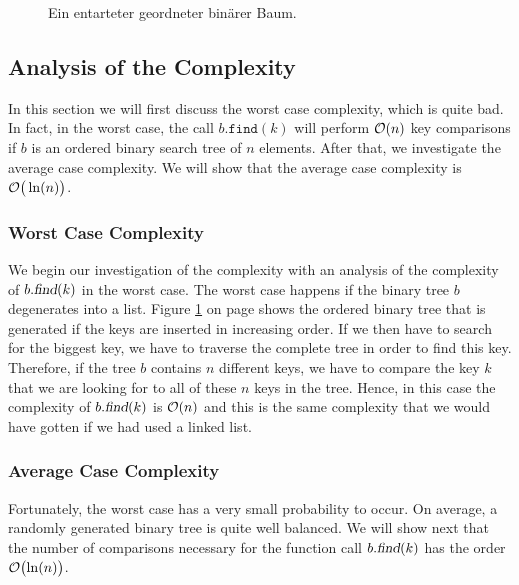 \begin{figure}[!th]
  \centering 
  \caption{Ein entarteter  geordneter bin\"arer Baum.}
  \label{fig:degenerated}
\end{figure}


\subsection{Analysis of the Complexity}
In this section we will first discuss the worst case complexity, which is quite bad.  In fact, in
the worst case, the call $b.\mathtt{find}(k)$ will perform $\mathcal{O}(n)$ key comparisons if $b$ is an ordered
binary search tree of $n$ elements.  After that, we investigate the average case complexity.  We
will show that the average case complexity is $\mathcal{O}\bigr(\ln(n)\bigr)$.

\subsubsection{Worst Case Complexity}
We begin our investigation of the complexity with an analysis of the complexity of $b.\textsl{find}(k)$ 
in the worst case.  The worst case happens if the binary tree $b$ degenerates into a list.
Figure \ref{fig:degenerated} on page \pageref{fig:degenerated} shows the ordered binary tree that
is generated if the keys are inserted in increasing order.  If we then have to search for the
biggest key, we have to traverse the complete tree in order to find this key.  Therefore, if the
tree $b$ contains $n$ different keys, we have to compare the key $k$ that we are looking for to all
of these $n$ keys in the tree.  Hence, in this case the complexity of $b.\textsl{find}(k)$ is 
$\mathcal{O}(n)$ and this is the same complexity that we would have gotten if we had used a linked list.


\subsubsection{Average Case Complexity}
Fortunately, the worst case has a very small probability to occur. On average, a randomly generated
binary tree is quite well balanced.  We will show next that the number of comparisons necessary for
the function call $b.\textsl{find}(k)$ has the order $\mathcal{O}\bigl(\ln(n)\bigr)$.  



